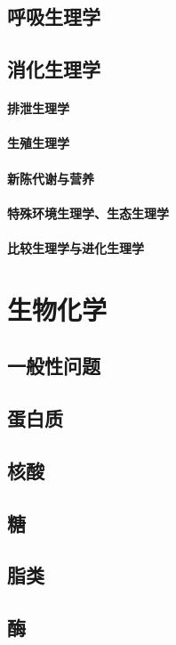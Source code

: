 \documentclass[UTF8]{../NatureUniverse}
\begin{document}
\section{呼吸生理学}
\section{消化生理学}
    \subsubsection{排泄生理学}
    \subsubsection{生殖生理学}
    \subsubsection{新陈代谢与营养}
    \subsubsection{特殊环境生理学、生态生理学}
    \subsubsection{比较生理学与进化生理学}







\chapter{生物化学}
\section{一般性问题}
\section{蛋白质}
\section{核酸}
\section{糖}
\section{脂类}
\section{酶}
\end{document}
